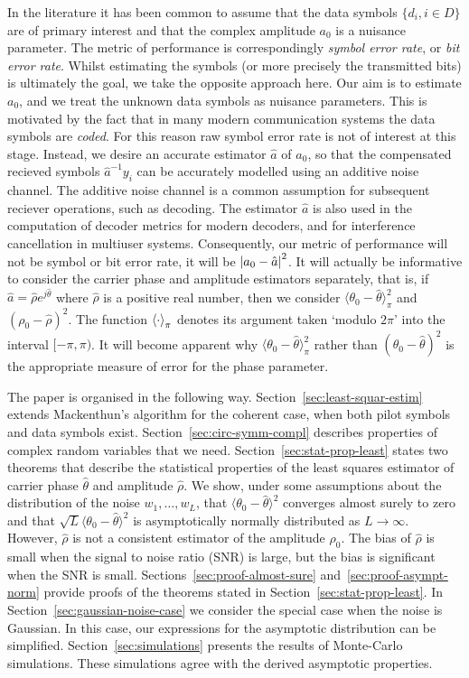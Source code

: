 \documentclass[journal]{IEEEtran}
\begin{document}
In the literature it has been common to assume that the data symbols $\{d_i, i \in D\}$ are of primary interest and that the complex amplitude $a_0$ is a nuisance parameter.  The metric of performance is correspondingly \emph{symbol error rate}, or \emph{bit error rate}.  Whilst estimating the symbols (or more precisely the transmitted bits) is ultimately the goal, we take the opposite approach here.  Our aim is to estimate $a_0$, and we treat the unknown data symbols as nuisance parameters.  This is motivated by the fact that in many modern communication systems the data symbols are \emph{coded}.  For this reason raw symbol error rate is not of interest at this stage.  Instead, we desire an accurate estimator $\hat{a}$ of $a_0$, so that the compensated recieved symbols $\hat{a}^{-1}y_i$ can be accurately modelled using an additive noise channel.  The additive noise channel is a common assumption for subsequent reciever operations, such as decoding.  The estimator $\hat{a}$ is also used in the computation of decoder metrics for modern decoders, and for interference cancellation in multiuser systems.  Consequently, our metric of performance will not be symbol or bit error rate, it will be ${\left\vert a_0 - \hat{a} \right\vert}^2$. It will actually be informative to consider the carrier phase and amplitude estimators separately, that is, if $\hat{a} = \hat{\rho}e^{j\hat{\theta}}$ where $\hat{\rho}$ is a positive real number, then we consider $\langle\theta_0 - \hat{\theta}\rangle_\pi^2$ and $(\rho_0 - \hat{\rho})^2$.  The function $\left\langle \cdot \right\rangle_\pi$ denotes its argument taken `modulo $2\pi$' into the interval $[-\pi, \pi)$.  It will become apparent why $\langle\theta_0 - \hat{\theta}\rangle_\pi^2$ rather than $(\theta_0 - \hat{\theta})^2$ is the appropriate measure of error for the phase parameter.

The paper is organised in the following way.  Section~\ref{sec:least-squar-estim} extends Mackenthun's algorithm for the coherent case, when both pilot symbols and data symbols exist.  Section~\ref{sec:circ-symm-compl} describes properties of complex random variables that we need.  Section~\ref{sec:stat-prop-least} states two theorems that describe the statistical properties of the least squares estimator of carrier phase $\hat{\theta}$ and amplitude $\hat{\rho}$.  We show, under some assumptions about the distribution of the noise $w_1,\dots,w_L$, that $\langle\theta_0 - \hat{\theta}\rangle^2$ converges almost surely to zero and that $\sqrt{L}\langle\theta_0 - \hat{\theta}\rangle^2$ is asymptotically normally distributed as $L\rightarrow \infty$.  However, $\hat{\rho}$ is not a consistent estimator of the amplitude $\rho_0$.  The bias of $\hat{\rho}$ is small when the signal to noise ratio (SNR) is large, but the bias is significant when the SNR is small.  Sections~\ref{sec:proof-almost-sure} and~\ref{sec:proof-asympt-norm} provide proofs of the theorems stated in Section~\ref{sec:stat-prop-least}.  In Section~\ref{sec:gaussian-noise-case} we consider the special case when the noise is Gaussian.  In this case, our expressions for the asymptotic distribution can be simplified.  Section~\ref{sec:simulations} presents the results of Monte-Carlo simulations.  These simulations agree with the derived asymptotic properties. 
\end{document}

